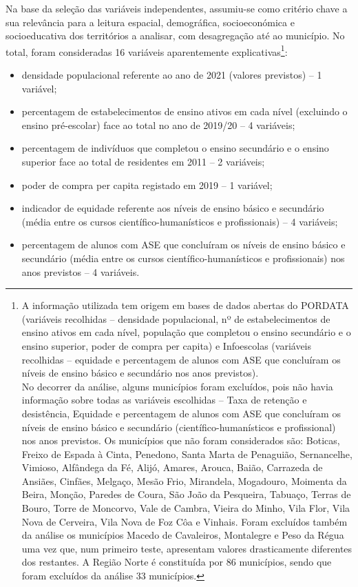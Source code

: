 \documentclass[
]{book}
\providecommand{\tightlist}{%
  \setlength{\itemsep}{0pt}\setlength{\parskip}{0pt}}
\begin{document}
Na base da seleção das variáveis independentes, assumiu-se como critério chave a sua relevância para a leitura espacial, demográfica, socioeconómica e socioeducativa dos territórios a analisar, com desagregação até ao município. No total, foram consideradas 16 variáveis aparentemente explicativas\footnote{A informação utilizada tem origem em bases de dados abertas do PORDATA (variáveis recolhidas -- densidade populacional, nº de estabelecimentos de ensino ativos em cada nível, população que completou o ensino secundário e o ensino superior, poder de compra per capita) e Infoescolas (variáveis recolhidas -- equidade e percentagem de alunos com ASE que concluíram os níveis de ensino básico e secundário nos anos previstos).\\
  No decorrer da análise, alguns municípios foram excluídos, pois não havia informação sobre todas as variáveis escolhidas -- Taxa de retenção e desistência, Equidade e percentagem de alunos com ASE que concluíram os níveis de ensino básico e secundário (científico-humanísticos e profissional) nos anos previstos. Os municípios que não foram considerados são: Boticas, Freixo de Espada à Cinta, Penedono, Santa Marta de Penaguião, Sernancelhe, Vimioso, Alfândega da Fé, Alijó, Amares, Arouca, Baião, Carrazeda de Ansiães, Cinfães, Melgaço, Mesão Frio, Mirandela, Mogadouro, Moimenta da Beira, Monção, Paredes de Coura, São João da Pesqueira, Tabuaço, Terras de Bouro, Torre de Moncorvo, Vale de Cambra, Vieira do Minho, Vila Flor, Vila Nova de Cerveira, Vila Nova de Foz Côa e Vinhais. Foram excluídos também da análise os municípios Macedo de Cavaleiros, Montalegre e Peso da Régua uma vez que, num primeiro teste, apresentam valores drasticamente diferentes dos restantes. A Região Norte é constituída por 86 municípios, sendo que foram excluídos da análise 33 municípios.}:

\begin{itemize}
\tightlist
\item
  densidade populacional referente ao ano de 2021 (valores previstos) -- 1 variável;
\item
  percentagem de estabelecimentos de ensino ativos em cada nível (excluindo o ensino pré-escolar) face ao total no ano de 2019/20 -- 4 variáveis;
\item
  percentagem de indivíduos que completou o ensino secundário e o ensino superior face ao total de residentes em 2011 -- 2 variáveis;
\item
  poder de compra per capita registado em 2019 -- 1 variável;
\item
  indicador de equidade referente aos níveis de ensino básico e secundário (média entre os cursos científico-humanísticos e profissionais) -- 4 variáveis;
\item
  percentagem de alunos com ASE que concluíram os níveis de ensino básico e secundário (média entre os cursos científico-humanísticos e profissionais) nos anos previstos -- 4 variáveis.
\end{itemize}
\end{document}
